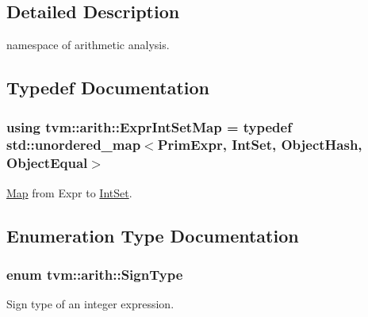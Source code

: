 \subsection{Detailed Description}
namespace of arithmetic analysis. 

\subsection{Typedef Documentation}
\subsubsection[{\texorpdfstring{Expr\+Int\+Set\+Map}{ExprIntSetMap}}]{\setlength{\rightskip}{0pt plus 5cm}using {\bf tvm\+::arith\+::\+Expr\+Int\+Set\+Map} = typedef std\+::unordered\+\_\+map$<${\bf Prim\+Expr}, {\bf Int\+Set}, Object\+Hash, Object\+Equal$>$}\hypertarget{namespacetvm_1_1arith_a94daf21fa21c1f7dd83081248f26d9eb}{}\label{namespacetvm_1_1arith_a94daf21fa21c1f7dd83081248f26d9eb}


\hyperlink{classtvm_1_1Map}{Map} from Expr to \hyperlink{classtvm_1_1arith_1_1IntSet}{Int\+Set}. 



\subsection{Enumeration Type Documentation}
\subsubsection[{\texorpdfstring{Sign\+Type}{SignType}}]{\setlength{\rightskip}{0pt plus 5cm}enum {\bf tvm\+::arith\+::\+Sign\+Type}}\hypertarget{namespacetvm_1_1arith_aca8806e355ad3dd5f1df9c1eca9aac9d}{}\label{namespacetvm_1_1arith_aca8806e355ad3dd5f1df9c1eca9aac9d}


Sign type of an integer expression. 

